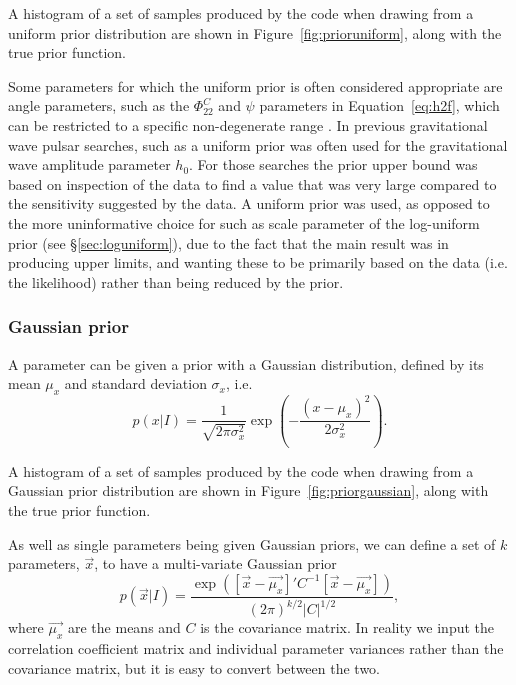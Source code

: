 A histogram of a set of samples produced by the code when drawing from a uniform prior distribution are shown in Figure~\ref{fig:prioruniform},
along with the true prior function.

Some parameters for which the uniform prior is often considered appropriate are angle parameters, such as the $\Phi_{22}^C$ and $\psi$
parameters in Equation~\ref{eq:h2f}, which can be restricted to a specific non-degenerate range \citep[see, e.g., Table~1 in][]{2015MNRAS.453.4399P}. 
In previous gravitational wave pulsar searches, such as \citet{2010ApJ...713..671A,2014ApJ...785..119A} a uniform prior was often used for
the gravitational wave amplitude parameter $h_0$. For those searches the prior upper bound was based on inspection of the data to find a
value that was very large compared to the sensitivity suggested by the data. A uniform prior was used, as opposed to the more
uninformative choice for such as scale parameter of the log-uniform prior (see \S\ref{sec:loguniform}), due to the fact that the main
result was in producing upper limits, and wanting these to be primarily based on the data (i.e. the likelihood) rather than being reduced
by the prior.

\subsubsection{Gaussian prior}\label{sec:gaussianprior}

A parameter can be given a prior with a Gaussian distribution, defined by its mean $\mu_x$ and standard deviation $\sigma_x$, i.e.
\begin{equation}
 p(x|I) = \frac{1}{\sqrt{2\pi\sigma_x^2}}\exp{\left(-\frac{(x-\mu_x)^2}{2\sigma_x^2}\right)}.
\end{equation}

A histogram of a set of samples produced by the code when drawing from a Gaussian prior distribution are shown in Figure~\ref{fig:priorgaussian},
along with the true prior function.

As well as single parameters being given Gaussian priors, we can define a set of $k$ parameters, $\vec{x}$, to have a multi-variate Gaussian prior
\begin{equation}
 p(\vec{x}|I) = \frac{\exp{\left([\vec{x}-\vec{\mu_x}]'C^{-1}[\vec{x}-\vec{\mu_x}] \right)}}{(2\pi)^{k/2}|C|^{1/2}},
\end{equation}
where $\vec{\mu_x}$ are the means and $C$ is the covariance matrix. In reality we input the correlation coefficient matrix and individual
parameter variances rather than the covariance matrix, but it is easy to convert between the two.

